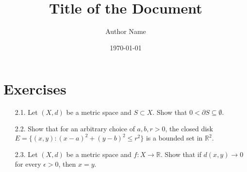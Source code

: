 \documentclass{article}
\title{\textbf{Title of the Document}}
\author{Author Name}
\date{\today}
\theoremstyle{definition}
\numberwithin{equation}{section}
\begin{document}
\maketitle
\tableofcontents
\newpage
\section{Exercises}
\begin{enumerate}
    \item[2.1.] Let \((X, d)\) be a metric space and \(S \subset X\). Show that \(0 < \partial S \subseteq \emptyset\).
    \item[2.2.] Show that for an arbitrary choice of \(a, b, r > 0\), the closed disk \( E = \{ (x, y) : (x - a)^2 + (y - b)^2 \leq r^2\} \) is a bounded set in \(\mathbb{R}^2\).
    \item[2.3.] Let \((X, d)\) be a metric space and \(f: X \to \mathbb{R}\). Show that if \(d(x, y) \to 0\) for every \(\epsilon > 0\), then \(x = y\).
\end{enumerate}
\end{document}
